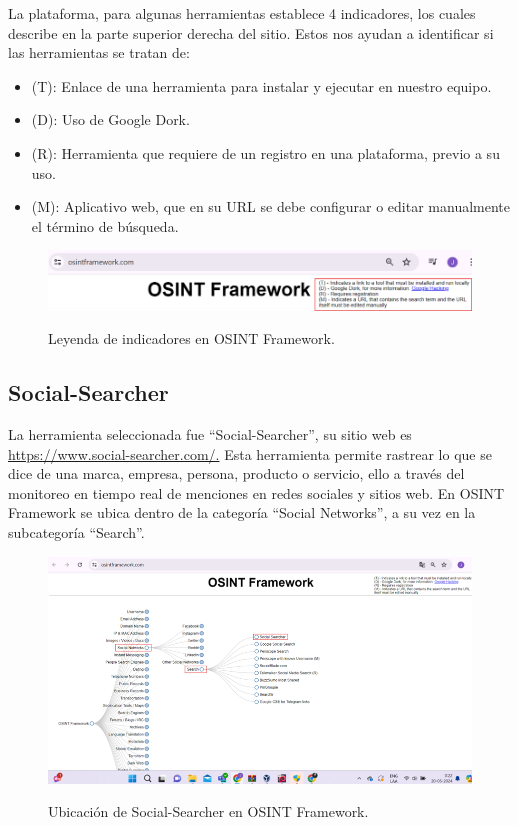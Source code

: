 \documentclass[stu, 11pt, letterpaper, donotrepeattitle, floatsintext, natbib]{apa7}
\begin{document}
La plataforma, para algunas herramientas establece 4 indicadores, los cuales describe en la parte superior derecha del sitio. Estos nos ayudan a identificar si las herramientas se tratan de:

\begin{itemize}
\item (T): Enlace de una herramienta para instalar y ejecutar en nuestro equipo.
\item (D): Uso de Google Dork.
\item (R): Herramienta que requiere de un registro en una plataforma, previo a su uso.
\item (M): Aplicativo web, que en su URL se debe configurar o editar manualmente el término de búsqueda. 
\end{itemize}

\begin{figure}[H]
\centering
\caption{Leyenda de indicadores en OSINT Framework.}
\includegraphics[width=0.75\linewidth]{osi2.png} %
\label{fig:OverallEffect}
\end{figure}

\subsection{Social-Searcher}

La herramienta seleccionada fue “Social-Searcher”, su sitio web es \url{https://www.social-searcher.com/.} Esta herramienta permite rastrear lo que se dice de una marca, empresa, persona, producto o servicio, ello a través del monitoreo en tiempo real de menciones en redes sociales y sitios web. En OSINT Framework se ubica dentro de la categoría “Social Networks”, a su vez en la subcategoría “Search”.

\begin{figure}[H]
\centering
\caption{Ubicación de Social-Searcher en OSINT Framework.}
\includegraphics[width=0.75\linewidth]{osi3.png} %
\label{fig:OverallEffect}
\end{figure}
\end{document}
